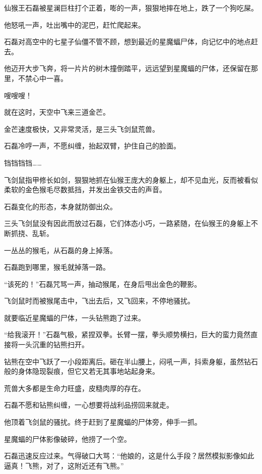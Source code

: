 
\begin{this_body}



仙猴王石磊被星澜巨柱打个正着，嘭的一声，狠狠地摔在地上，跌了一个狗吃屎。

他怒吼一声，吐出嘴中的泥巴，赶忙爬起来。

石磊对高空中的七星子仙僵不管不顾，想到最近的星魔蝠尸体，向记忆中的地点赶去。

他迈开大步飞奔，将一片片的树木撞倒踏平，远远望到星魔蝠的尸体，还保留在那里，不禁心中一喜。

嗖嗖嗖！

就在这时，天空中飞来三道金芒。

金芒速度极快，又非常灵活，是三头飞剑鼠荒兽。

石磊冷哼一声，不愿纠缠，抬起双臂，护住自己的脸面。

铛铛铛铛……

飞剑鼠指甲修长如剑，狠狠地抓在仙猴王庞大的身躯上，却不见血光，反而被看似柔软的金色猴毛尽数抵挡，并发出金铁交击的声音。

石磊变化的形态，本身就防御出众。

三头飞剑鼠没有因此而放过石磊，它们体态小巧，一路紧随，在仙猴王的身躯上不断抓挠、乱斩。

一丛丛的猴毛，从石磊的身上掉落。

石磊跑到哪里，猴毛就掉落一路。

“该死的！”石磊咒骂一声，抽动猴尾，在身后甩出金色的鞭影。

飞剑鼠时而被猴尾击中，飞出去后，又飞回来，不停地骚扰。

就要临近星魔蝠的尸体，一头钻熊跑了过来。

“给我滚开！”石磊气极，紧捏双拳。长臂一摆，拳头顺势横扫，巨大的蛮力竟然直接将一头沉重的钻熊扫开。

钻熊在空中飞跃了一小段距离后。砸在半山腰上，闷吼一声，抖索身躯，虽然钻石般的身体隐现裂痕，但它又若无其事地站起身来。

荒兽大多都是生命力旺盛，皮糙肉厚的存在。

石磊不愿和钻熊纠缠，一心想要将战利品捞回来就走。

他顶着飞剑鼠的骚扰。终于赶到了星魔蝠的尸体旁，伸手一抓。

星魔蝠的尸体影像破碎，他捞了一个空。

石磊迅速反应过来。气得破口大骂：“他娘的，这是什么手段？居然模拟影像如此逼真！飞熊，对了，这附近还有飞熊。”


\end{this_body}
